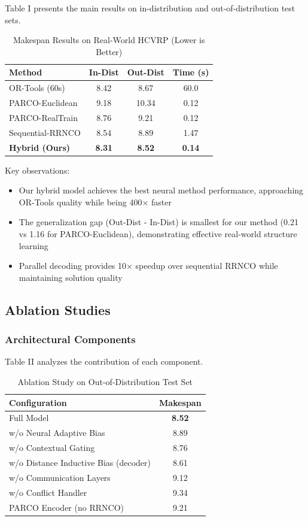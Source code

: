 \documentclass[lettersize,journal]{IEEEtran}
\begin{document}
Table I presents the main results on in-distribution and out-of-distribution test sets.

\begin{table}[h]
\centering
\caption{Makespan Results on Real-World HCVRP (Lower is Better)}
\begin{tabular}{lccc}
\toprule
\textbf{Method} & \textbf{In-Dist} & \textbf{Out-Dist} & \textbf{Time (s)} \\
\midrule
OR-Tools (60s) & 8.42 & 8.67 & 60.0 \\
\midrule
PARCO-Euclidean & 9.18 & 10.34 & 0.12 \\
PARCO-RealTrain & 8.76 & 9.21 & 0.12 \\
Sequential-RRNCO & 8.54 & 8.89 & 1.47 \\
\midrule
\textbf{Hybrid (Ours)} & \textbf{8.31} & \textbf{8.52} & \textbf{0.14} \\
\bottomrule
\end{tabular}
\end{table}

Key observations:
\begin{itemize}
\item Our hybrid model achieves the best neural method performance, approaching OR-Tools quality while being 400× faster
\item The generalization gap (Out-Dist - In-Dist) is smallest for our method (0.21 vs 1.16 for PARCO-Euclidean), demonstrating effective real-world structure learning
\item Parallel decoding provides 10× speedup over sequential RRNCO while maintaining solution quality
\end{itemize}

\subsection{Ablation Studies}

\subsubsection{Architectural Components}

Table II analyzes the contribution of each component.

\begin{table}[h]
\centering
\caption{Ablation Study on Out-of-Distribution Test Set}
\begin{tabular}{lc}
\toprule
\textbf{Configuration} & \textbf{Makespan} \\
\midrule
Full Model & \textbf{8.52} \\
\midrule
w/o Neural Adaptive Bias & 8.89 \\
w/o Contextual Gating & 8.76 \\
w/o Distance Inductive Bias (decoder) & 8.61 \\
w/o Communication Layers & 9.12 \\
w/o Conflict Handler & 9.34 \\
\midrule
PARCO Encoder (no RRNCO) & 9.21 \\
\bottomrule
\end{tabular}
\end{table}
\end{document}
